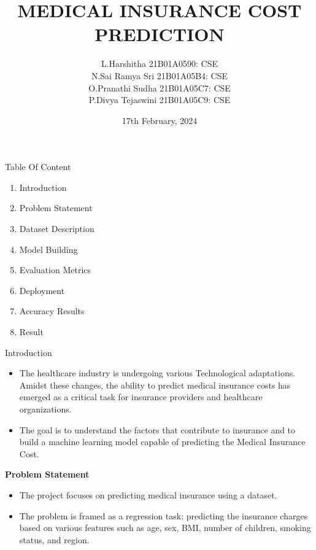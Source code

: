 \documentclass{beamer}
\title[]{\textbf{MEDICAL INSURANCE COST PREDICTION}}
\institute{\Large\textbf{ SHRI VISHNU ENGINEERING COLLEGE FOR WOMEN}}
\author[]{L.Harshitha 21B01A0590: CSE\\
        N.Sai Ramya Sri 21B01A05B4: CSE \\
        O.Pranathi Sudha 21B01A05C7: CSE\\
        P.Divya Tejaswini 21B01A05C9: CSE\\}
\date{17th February, 2024}
\begin{document}
\begin{frame}
  \titlepage
\end{frame}


\begin{frame}{Table Of Content}
 \tableofcontents
\begin{enumerate}
    \item Introduction
     \item Problem Statement
      \item Dataset Description
       \item Model Building
        \item Evaluation Metrics
         \item Deployment
          \item Accuracy Results
             \item Result    
\end{enumerate}
\end{frame}


\begin{frame}{Introduction}

\begin{itemize}
  \item The healthcare industry is undergoing various Technological adaptations. Amidst these changes, the ability to predict medical insurance costs has emerged as a critical task for insurance providers and healthcare organizations. \\
  \item The goal is to understand the factors that contribute to insurance and to build a machine learning model capable of predicting the Medical Insurance Cost.\\
  \end{itemize}
\end{frame}

\begin{frame}{\textbf{Problem Statement}}
\begin{itemize}
\item The project focuses on predicting medical insurance using a dataset.\\
\item The problem is framed as a regression task: predicting the insurance charges based on various features such as age, sex, BMI, number of children, smoking status, and region.\\
\end{itemize}



\end{frame}
\end{document}
